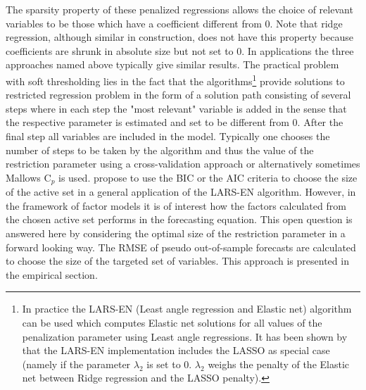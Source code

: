 \documentclass[12pt]{article}
\begin{document}
The sparsity property of these penalized regressions allows the choice of relevant variables to be those which have a coefficient different from $0$. Note that ridge regression, although similar in construction, does not have this property because coefficients are shrunk in absolute size but not set to $0$. In applications the three approaches named above typically give similar results.
The practical problem with soft thresholding lies in the fact that the algorithms\footnote{In practice the LARS-EN (Least angle regression and Elastic net) algorithm can be used which computes Elastic net solutions for all values of the penalization parameter using Least angle regressions. It has been shown by \citet{efron_hastie_johnstone_tibshirani2004} that the LARS-EN implementation includes the LASSO as special case (namely if the parameter $\lambda_2$ is set to 0. $\lambda_2$ weighs the penalty of the Elastic net between Ridge regression and the LASSO penalty).} provide solutions to restricted regression problem in the form of a solution path consisting of several steps where in each step the "most relevant" variable is added in the sense that the respective parameter is estimated and set to be different from $0$. After the final step all variables are included in the model. Typically one chooses the number of steps to be taken by the algorithm and thus the value of the restriction parameter using a cross-validation approach or alternatively sometimes Mallows C$_p$ is used. \citet{bai2008forecasting} propose to use the BIC or the AIC criteria to choose the size of the active set in a general application of the LARS-EN algorithm. However, in the framework of factor models it is of interest how the factors calculated from the chosen active set performs in the forecasting equation. This open question is answered here by considering the optimal size of the restriction parameter in a forward looking way. The RMSE of pseudo out-of-sample forecasts are calculated to choose the size of the targeted set of variables. This approach is presented in the empirical section. \\
\end{document}
